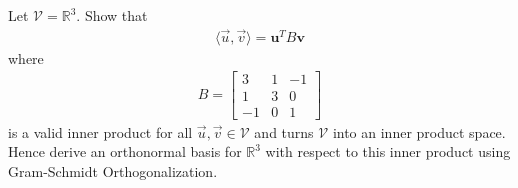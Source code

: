 \begin{Exercise}
Let $\mathcal{V} = \mathbb{R}^3$. Show that
\begin{align*}
\langle\vec{u}, \vec{v}\rangle = \textbf{u}^TB\textbf{v}
\end{align*}
where 
\begin{align*}
B = 
\begin{bmatrix}
3 & 1 & -1 \\ 
1 & 3 & 0 \\ 
-1 & 0 & 1
\end{bmatrix}
\end{align*}
is a valid inner product for all $\vec{u}, \vec{v} \in \mathcal{V}$ and turns $\mathcal{V}$ into an inner product space. Hence derive an orthonormal basis for $\mathbb{R}^3$ with respect to this inner product using Gram-Schmidt Orthogonalization. 
\end{Exercise}
